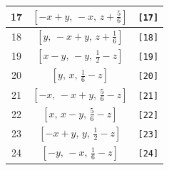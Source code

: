 \documentclass[fleqn,8pt]{jsarticle}
\begin{document}
\begin{longtable}{ccc}
17 & $\left[ - x + y,\, - x,\, z + \frac{5}{6} \right]$ & {\tt [17]} \\ \hline
18 & $\left[ y,\, - x + y,\, z + \frac{1}{6} \right]$ & {\tt [18]} \\ \hline
19 & $\left[ x - y,\, - y,\, \frac{1}{2} - z \right]$ & {\tt [19]} \\ \hline
20 & $\left[ y,\, x,\, \frac{1}{6} - z \right]$ & {\tt [20]} \\ \hline
21 & $\left[ - x,\, - x + y,\, \frac{5}{6} - z \right]$ & {\tt [21]} \\ \hline
22 & $\left[ x,\, x - y,\, \frac{5}{6} - z \right]$ & {\tt [22]} \\ \hline
23 & $\left[ - x + y,\, y,\, \frac{1}{2} - z \right]$ & {\tt [23]} \\ \hline
24 & $\left[ - y,\, - x,\, \frac{1}{6} - z \right]$ & {\tt [24]} \\
\end{longtable}
\end{document}
